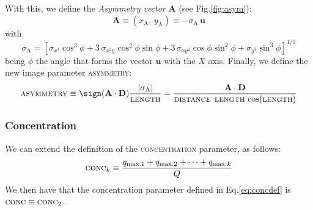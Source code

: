 %
With this, we define the \emph{Asymmetry vector} $\mathbf{A}$ (see
Fig.\ref{fig:asym}):
%
\begin{equation}
  \label{eq:asymmetryvec}
  \mathbf{A} \equiv (x_{\mathrm{A}},\, y_{\mathrm{A}}) 
  \equiv -\sigma_{\mathrm{A}}\,\mathbf{u}
\end{equation}
%
with
%
\begin{equation}
  \label{eq:sigmaA}
  \sigma_{\mathrm{A}} = \left[
    \sigma_{x^3}\cos^3\phi +
    3\, \sigma_{x^2 y}\cos^2\phi\sin\phi +
    3\, \sigma_{x y^2}\cos\phi\sin^2\phi +
    \sigma_{y^3}\sin^3\phi\right]^{1/3}
\end{equation}
%
being $\phi$ the angle that forms the vector $\mathbf{u}$ with the $X$
axis. Finally, we define the new image parameter {\scshape asymmetry}:
%
\begin{equation}
  \label{eq:asymmetry}
  \text{\scshape asymmetry} \equiv
  \sign(\mathbf{A}\cdot\mathbf{D})
  \frac{|\sigma_{\mathrm{A}}|}{\text{\scshape length}} =
  \frac{\mathbf{A}\cdot\mathbf{D}}{\text{\scshape distance}\mspace{8mu}
    \text{\scshape length}\,\cos(\text{\scshape length})}
\end{equation}

\subsubsection*{Concentration}
%
We can extend the definition of the {\scshape concentration}
parameter, as follows:
%
\begin{equation}
  \label{eq:conck}
  \text{\scshape conc}_k \equiv
  \frac{q_{\mathrm{max.1}} + q_{\mathrm{max.2}} + \cdots 
    + q_{\mathrm{max.}k}}{Q}
\end{equation}
%
We then have that the concentration parameter defined in
Eq.\eqref{eq:concdef} is $\text{\scshape conc} \equiv \text{\scshape
  conc}_2$.

\clearpage

\asymfig

\mbox{}

\endinput
%

